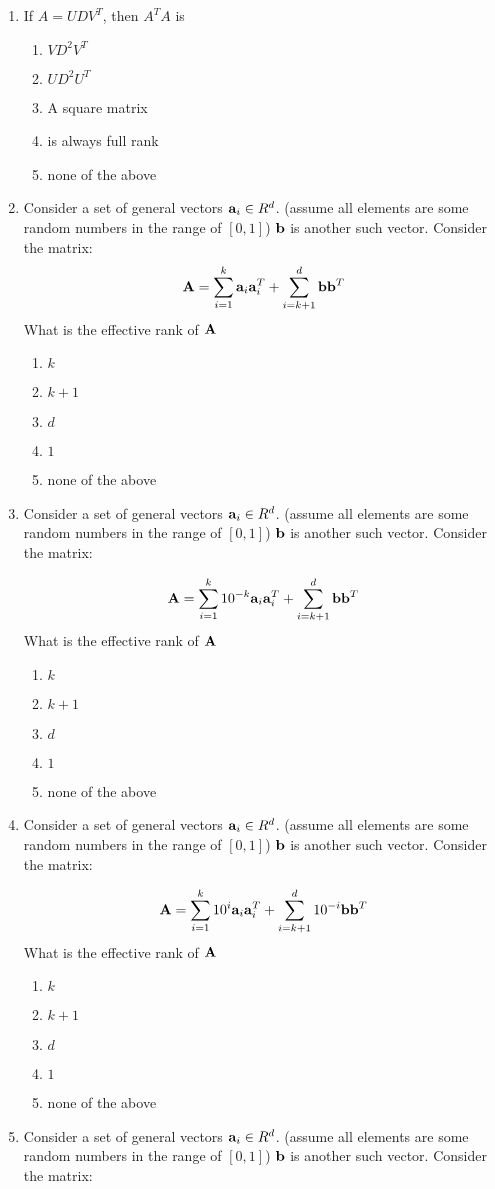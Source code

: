 \documentclass{article}
\begin{document}
\begin{enumerate}
    \item If $A=UDV^T$, then $A^TA$ is
    \begin{enumerate}
        \item $VD^2V^T$
        \item $UD^2U^T$
        \item A square matrix
        \item is always full rank
        \item none of the above
    \end{enumerate}

    \item Consider a set of general vectors ${\bf a}_i\in R^d$. (assume all elements are some random numbers in the range of $[0,1]$) ${\bf b}$ is another such vector. Consider the matrix:
    \[ {\bf A} = \sum_{i=1}^k {\bf a}_i {\bf a}_i^T + \sum_{i=k+1}^d {\bf b}{\bf b}^T\]
    What is the effective rank of ${\bf A}$
    \begin{enumerate}
        \item $k$
        \item $k+1$
        \item $d$
        \item $1$
        \item none of the above
    \end{enumerate}
     \item Consider a set of general vectors ${\bf a}_i\in R^d$. (assume all elements are some random numbers in the range of $[0,1]$) ${\bf b}$ is another such vector. Consider the matrix:

    \[ {\bf A} = \sum_{i=1}^k 10^{-k} {\bf a}_i {\bf a}_i^T + \sum_{i=k+1}^d {\bf b}{\bf b}^T\]
    What is the effective rank of ${\bf A}$
    \begin{enumerate}
        \item $k$
        \item $k+1$
        \item $d$
        \item $1$
        \item none of the above
    \end{enumerate}
     \item Consider a set of general vectors ${\bf a}_i\in R^d$. (assume all elements are some random numbers in the range of $[0,1]$) ${\bf b}$ is another such vector. Consider the matrix:

    \[ {\bf A} = \sum_{i=1}^k 10^{i} {\bf a}_i {\bf a}_i^T + \sum_{i=k+1}^d 10^{-i}{\bf b}{\bf b}^T\]
    What is the effective rank of ${\bf A}$
    \begin{enumerate}
        \item $k$
        \item $k+1$
        \item $d$
        \item $1$
        \item none of the above
    \end{enumerate}
     \item Consider a set of general vectors ${\bf a}_i\in R^d$. (assume all elements are some random numbers in the range of $[0,1]$) ${\bf b}$ is another such vector. Consider the matrix:


\end{enumerate}
\end{document}
